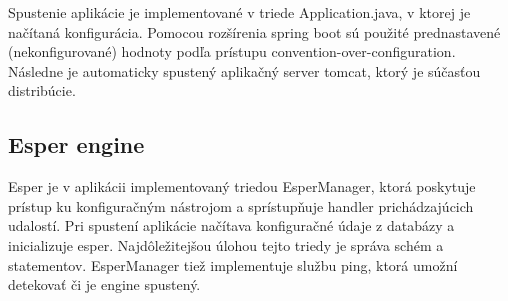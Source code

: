 		Spustenie aplikácie je implementované v triede Application.java, v ktorej je načítaná konfigurácia. Pomocou rozšírenia spring boot sú použité prednastavené (nekonfigurované) hodnoty podľa prístupu convention-over-configuration. Následne je automaticky spustený aplikačný server tomcat, ktorý je súčasťou distribúcie.

	\subsection{Esper engine}
		Esper je v aplikácii implementovaný triedou EsperManager, ktorá poskytuje prístup ku konfiguračným nástrojom a sprístupňuje handler prichádzajúcich udalostí. Pri spustení aplikácie načítava konfiguračné údaje z databázy a inicializuje esper. Najdôležitejšou úlohou tejto triedy je správa schém a statementov. EsperManager tiež implementuje službu ping, ktorá umožní detekovať či je engine spustený.
		
